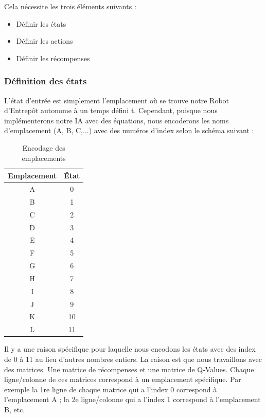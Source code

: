\documentclass{article}
\begin{document}
Cela nécessite les trois éléments suivants :
\begin{itemize}
    \item Définir les états
    \item Définir les actions
    \item Définir les récompenses
\end{itemize}

\subsubsection{Définition des états}
L'état d'entrée est simplement l'emplacement où se trouve notre Robot d'Entrepôt autonome à un temps défini t. Cependant, puisque nous implémenterons notre IA avec des équations, nous encoderons les noms d'emplacement (A, B, C,...) avec des numéros d'index selon le schéma suivant :

\begin{table}[H]
    \centering
    \begin{tabular}{|c|c|}
        \hline
        Emplacement & État \\
        \hline
        A & 0 \\
	\hline
        B & 1 \\
	\hline
        C & 2 \\
	\hline
        D & 3 \\
	\hline
        E & 4 \\
	\hline
        F & 5 \\
	\hline
        G & 6 \\
	\hline
        H & 7 \\
	\hline
        I & 8 \\
	\hline
        J & 9 \\
	\hline
        K & 10 \\
	\hline
        L & 11 \\
        \hline
    \end{tabular}
    \caption{Encodage des emplacements}
\end{table}
Il y a une raison spécifique pour laquelle nous encodons les états avec des index de 0 à 11 au lieu d'autres nombres entiers. La raison est que nous travaillons avec des matrices. Une matrice de récompenses et une matrice de Q-Values. Chaque ligne/colonne de ces matrices correspond à un emplacement spécifique. Par exemple la 1re ligne de chaque matrice qui a l'index 0 correspond à l'emplacement A ; la 2e ligne/colonne qui a l'index 1 correspond à l'emplacement B, etc. 
\end{document}
